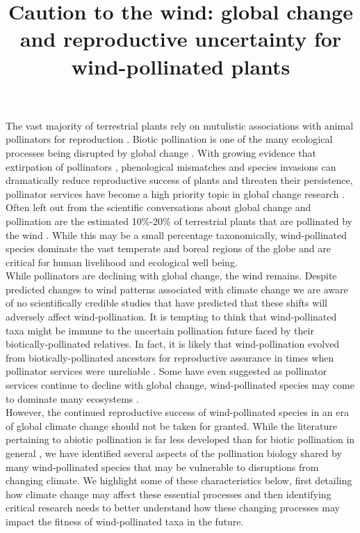 \documentclass[11pt]{article}
\title{Caution to the wind: global change and reproductive uncertainty for wind-pollinated plants}
\begin{document}
\maketitle


\noindent The vast majority of terrestrial plants rely on mutulistic associations with animal pollinators for reproduction \citep{Giannini1994}. Biotic pollination is one of the many ecological processes being disrupted by global change \citep{Gerard:2020aa}. With growing evidence that extirpation of pollinators \citep{Burkle:2013aa}, phenological mismatches \citep{Memmott2007} and species invasions \citep{Dietzsch:2011aa} can dramatically reduce reproductive success of plants and threaten their persistence, pollinator services have become a high priority topic in global change research \citep{Dicks975,Kremen:2000aa}.\\

\noindent Often left out from the scientific conversations about global change and pollination are the estimated 10\%-20\% of terrestrial plants that are pollinated by the wind \citep{Ollerton:2011aa,Friedman:2009aa,Ackerman:2000aa}. While this may be a small percentage taxonomically, wind-pollinated species dominate the vast temperate and boreal regions of the globe \citep{Regal:1982aa} and are critical for human livelihood and ecological well being.\\

\noindent While pollinators are declining with global change, the wind remains. Despite predicted changes to wind patterns associated with climate change \citep{IPCC2013} we are aware of no scientifically credible studies that have predicted that these shifts will adversely affect wind-pollination. It is tempting to think that wind-pollinated taxa might be immune to the uncertain pollination future faced by their biotically-pollinated relatives. In fact, it is likely that wind-pollination evolved from biotically-pollinated ancestors for reproductive assurance in times when pollinator services were unreliable \citep{Friedman:2009aa}. Some have even suggested as pollinator services continue to decline with global change, wind-pollinated species may come to dominate many ecosystems \citep{Bond:1995aa,Hoiss:2013aa}.\\

\noindent However, the continued reproductive success of wind-pollinated species in an era of global climate change should not be taken for granted. While the literature pertaining to abiotic pollination is far less developed than for biotic pollination in general \citep{Friedman:2009aa}, we have identified several aspects of the pollination biology shared by many wind-pollinated species that may be vulnerable to disruptions from changing climate. We highlight some of these characteristics below, first detailing how climate change may affect these essential processes and then identifying critical research needs to better understand how these changing processes may impact the fitness of wind-pollinated taxa in the future.
\end{document}
